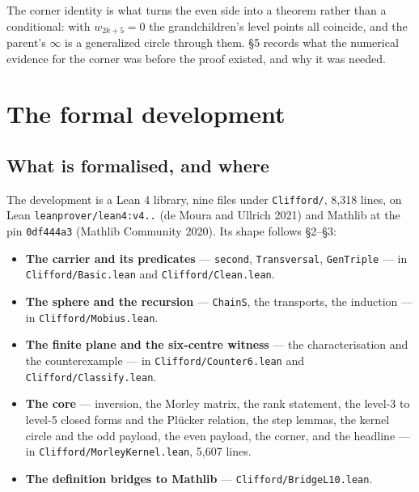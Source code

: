 \documentclass[11pt]{article}
\providecommand{\tightlist}{\setlength{\itemsep}{0pt}\setlength{\parskip}{0pt}}
\theoremstyle{definition}
\theoremstyle{remark}
\begin{document}
The corner identity is what turns the even side into a theorem rather than a conditional: with
\(w_{2k+5} = 0\) the grandchildren's level points all coincide, and the parent's $\infty$ is a generalized circle
through them. \S{}5 records what the numerical evidence for the corner was before the proof existed, and why
it was needed.

\hypertarget{the-formal-development}{%
\section{The formal development}\label{the-formal-development}}

\hypertarget{what-is-formalised-and-where}{%
\subsection{What is formalised, and where}\label{what-is-formalised-and-where}}

The development is a Lean 4 library, nine files under \texttt{Clifford/\allowbreak }, 8,318 lines, on Lean
\texttt{leanprover/\allowbreak lean4\allowbreak :v4..} (de Moura and Ullrich 2021) and Mathlib at the pin \texttt{0df444a3} (Mathlib
Community 2020). Its shape follows \S{}2--\S{}3:

\begin{itemize}
\tightlist
\item
  \textbf{The carrier and its predicates} --- \texttt{second}, \texttt{Transversal}, \texttt{GenTriple} --- in \texttt{Clifford/\allowbreak Basic.\allowbreak lean}
  and \texttt{Clifford/\allowbreak Clean.\allowbreak lean}.
\item
  \textbf{The sphere and the recursion} --- \texttt{ChainS}, the transports, the induction --- in \texttt{Clifford/\allowbreak Mobius.\allowbreak lean}.
\item
  \textbf{The finite plane and the six-centre witness} --- the characterisation and the counterexample --- in
  \texttt{Clifford/\allowbreak Counter6.\allowbreak lean} and \texttt{Clifford/\allowbreak Classify.\allowbreak lean}.
\item
  \textbf{The core} --- inversion, the Morley matrix, the rank statement, the level-3 to level-5 closed forms and
  the Plücker relation, the step lemmas, the kernel circle and the odd payload, the even payload, the
  corner, and the headline --- in \texttt{Clifford/\allowbreak MorleyKernel.\allowbreak lean}, 5,607 lines.
\item
  \textbf{The definition bridges to Mathlib} --- \texttt{Clifford/\allowbreak BridgeL10.\allowbreak lean}.
\end{itemize}
\end{document}
